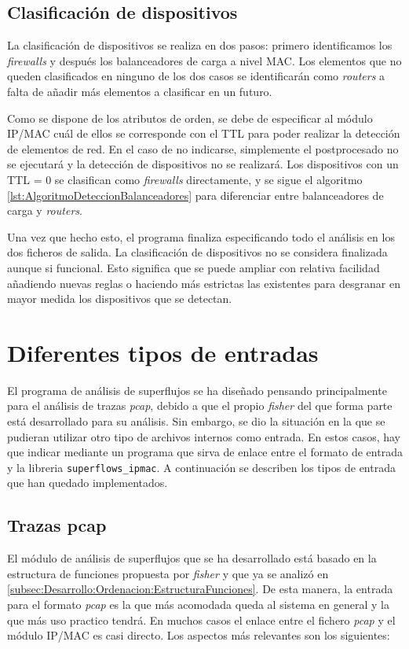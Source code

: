 \documentclass[twoside, 12pt]{epstfg}
\begin{document}
\subsection{Clasificación de dispositivos}
La clasificación de dispositivos se realiza en dos pasos: primero identificamos los \textit{firewalls} y después los balanceadores de carga a nivel MAC. Los elementos que no queden clasificados en ninguno de los dos casos se identificarán como \textit{routers} a falta de añadir más elementos a clasificar en un futuro.

Como se dispone de los atributos de orden, se debe de especificar al módulo IP/MAC cuál de ellos se corresponde con el TTL para poder realizar la detección de elementos de red. En el caso de no indicarse, simplemente el postprocesado no se ejecutará y la detección de dispositivos no se realizará. Los dispositivos con un TTL = 0 se clasifican como \textit{firewalls} directamente, y se sigue el algoritmo \ref{lst:AlgoritmoDeteccionBalanceadores} para diferenciar entre balanceadores de carga y \textit{routers}.

Una vez que hecho esto, el programa finaliza especificando todo el análisis en los dos ficheros de salida. La clasificación de dispositivos no se considera finalizada aunque si funcional. Esto significa que se puede ampliar con relativa facilidad añadiendo nuevas reglas o haciendo más estrictas las existentes para desgranar en mayor medida los dispositivos que se detectan.


\section{Diferentes tipos de entradas}
El programa de análisis de superflujos se ha diseñado pensando principalmente para el análisis de trazas \textit{pcap}, debido a que el propio \textit{fisher} del que forma parte está desarrollado para su análisis. Sin embargo, se dio la situación en la que se pudieran utilizar otro tipo de archivos internos como entrada. En estos casos, hay que indicar mediante un programa que sirva de enlace entre el formato de entrada y la libreria \texttt{superflows\_ipmac}. A continuación se describen los tipos de entrada que han quedado implementados.

\subsection{Trazas pcap}
El módulo de análisis de superflujos que se ha desarrollado está basado en la estructura de funciones propuesta por \textit{fisher} y que ya se analizó en \ref{subsec:Desarrollo:Ordenacion:EstructuraFunciones}. De esta manera, la entrada para el formato \textit{pcap} es la que más acomodada queda al sistema en general y la que más uso practico tendrá. En muchos casos el enlace entre el fichero \textit{pcap} y el módulo IP/MAC es casi directo. Los aspectos más relevantes son los siguientes:
\end{document}
